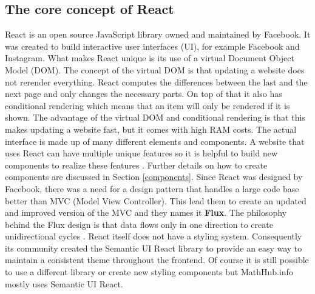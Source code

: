\documentclass[11pt,a4paper]{article}
\begin{document}
\subsection{The core concept of React} \label{react}
React is an open source JavaScript library owned and maintained by Facebook.
It was created to build interactive user interfaces (UI), for example Facebook and Instagram.
What makes React unique is its use of a virtual Document Object Model (DOM).
The concept of the virtual DOM is that updating a website does not rerender everything.
React computes the differences between the last and the next page and only changes the necessary parts.
On top of that it also has conditional rendering which means that an item will only be rendered if it is shown.
The advantage of the virtual DOM and conditional rendering is that this makes updating a website fast, but it comes with high RAM costs.
The actual interface is made up of many different elements and components.
A website that uses React can have multiple unique features so it is helpful to build new components to realize these features \cite{reactjs}.
Further details on how to create components are discussed in Section \ref{components}.
\newline \newline
Since React was designed by Facebook, there was a need for a design pattern that handles a large code base better than MVC (Model View Controller).
This lead them to create an updated and improved version of the MVC and they names it \textbf{Flux}.
The philosophy behind the Flux design is that data flows only in one direction to create unidirectional cycles \cite{flux}.
\newline \newline
React itself does not have a styling system.
Consequently its community created the Semantic UI React library to provide an easy way to maintain a consistent theme throughout the frontend.
Of course it is still possible to use a different library or create new styling components but MathHub.info mostly uses Semantic UI React.
\end{document}
